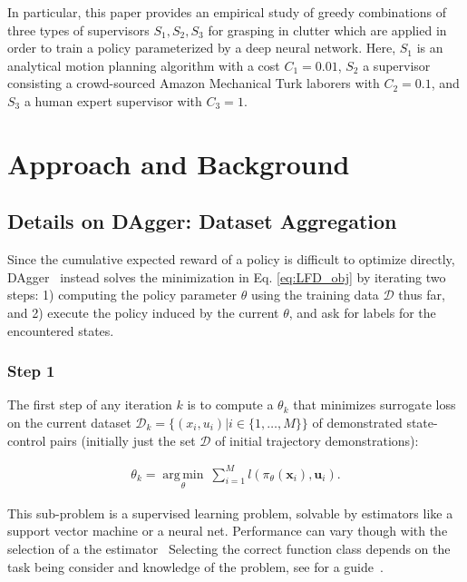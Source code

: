 \documentclass[10pt, conference]{ieeeconf}      %
\DeclareMathOperator*{\argmin}{arg\,min}
\newcommand{\bu}{\mathbf{u}}
\newcommand{\bx}{\mathbf{x}}
\begin{document}
 In particular, this paper provides an empirical study of greedy combinations of three types of supervisors $S_1,
S_2, S_3$ for grasping in clutter which are applied in order to train a policy parameterized by a deep neural network.
Here, $S_1$ is an analytical motion planning algorithm with a cost $C_1=0.01$, $S_2$ a supervisor
consisting a crowd-sourced Amazon Mechanical Turk laborers with $C_2=0.1$, and $S_3$ a human expert supervisor with
$C_3=1$.

\section{Approach and Background}
 \subsection{Details on DAgger: Dataset Aggregation}
Since the cumulative expected reward of a policy is difficult to optimize directly,
DAgger~\cite{ross2010reduction} instead solves the minimization in Eq. \ref{eq:LFD_obj} by iterating two steps: 1)
computing the policy parameter $\theta$ using the training data $\mathcal{D}$ thus far, and 2) execute the policy induced by the current $\theta$, and ask for labels for the encountered states. 
 
\subsubsection{Step 1}
The first step of any iteration $k$ is to compute a $\theta_k$ that minimizes surrogate loss on the current dataset $\mathcal{D}_k=\{(x_i,u_i)|i\in\{1,\ldots,M\}\}$ of demonstrated state-control pairs (initially just the set $\mathcal{D}$ of initial trajectory demonstrations):

 \vspace{-1ex}
\begin{align}\label{eq:super_objj}
\theta_{k} = \underset{\theta}{\argmin} \: \sum_{i=1}^{M} l(\pi_{\theta}(\bx_i),\bu_i).
\end{align}

This sub-problem is a supervised learning problem, solvable by estimators like a support vector machine or a neural net. Performance can vary though with the selection of a the estimator~ Selecting the correct function class depends on the task being consider and knowledge of the problem, see for a guide~\cite{scholkopf2002learning}. 
 
\end{document}
